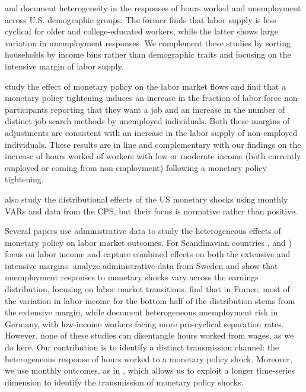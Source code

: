\documentclass[a4paper,12pt]{article}%
\begin{document}
\cite{KMPS:2020} and \cite{AMW:2021} document heterogeneity in the responses of hours worked and unemployment across U.S. demographic groups. The former finds that labor supply is less cyclical for older and college-educated workers, while the latter shows large variation in unemployment responses. 
We complement these studies by sorting households by income bins rather than demographic traits and focusing on the intensive margin of labor supply. 

\citet{GHS:2023} study the effect of monetary policy on the labor market flows and find that a monetary policy tightening induces an increase in the fraction of labor force non-participants reporting that they want a job and an increase in the number of distinct job search methods by unemployed individuals. Both these margins of adjustments are consistent with an increase in the labor supply of non-employed individuals. These results are in line and complementary with our findings on the increase of hours worked of workers with low or moderate income (both currently employed or coming from non-employment) following a monetary policy tightening.


\cite{DcGQW:2025} also study the distributional effects of the US monetary shocks using monthly VARs and data from the CPS, but their focus is normative rather than positive.

Several papers use administrative data to study the heterogeneous effects of monetary policy on labor market outcomes. For Scandinavian countries \citet{AJKRP:2020}, \citet{Andersen20} and \cite{HPT:2020}) focus on labor income and capture combined effects on both the extensive and intensive margins. \citet{COP:2025} analyze administrative data from Sweden and show that unemployment responses to monetary shocks vary across the earnings distribution, focusing on labor market transitions. 
\citet{HS:22} find that in France, most of the variation in labor income for the bottom half of the distribution stems from the extensive margin, while \citet{BKM:2022} document heterogeneous unemployment risk in Germany, with low-income workers facing more pro-cyclical separation rates. However, none of these studies can disentangle hours worked from wages, as we do here. Our contribution is to identify a distinct transmission channel: the heterogeneous response of hours worked to a monetary policy shock. Moreover, we use monthly outcomes, as in \citet{BKM:2022}, which allows us to exploit a longer time-series dimension to identify the transmission of monetary policy shocks.
\end{document}
